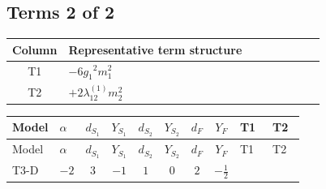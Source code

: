 \documentclass[8pt]{article}
\begin{document}
\begin{landscape}
\subsection*{Terms 2 of 2}
\begin{center}
\begin{tabular}{@{}c >{\raggedright\arraybackslash}p{0.82\linewidth}@{}}
\toprule
Column & Representative term structure \\
\midrule
T1 & \(\displaystyle -6 {g_1}^2 {m_1^2}\) \\
\midrule
T2 & \(\displaystyle +2 {\lambda_{12}^{(1)}} {m_2^2}\) \\
\midrule
\bottomrule
\end{tabular}
\end{center}
\smallskip
\tiny
\begin{longtable}{@{}llcccccc >{\raggedright\arraybackslash}p{0.21\linewidth} >{\raggedright\arraybackslash}p{0.21\linewidth}@{}}
\toprule
Model & $\alpha$ & $d_{S_1}$ & $Y_{S_1}$ & $d_{S_2}$ & $Y_{S_2}$ & $d_F$ & $Y_F$ & T1 & T2 \\
\midrule
\endfirsthead
\toprule
Model & $\alpha$ & $d_{S_1}$ & $Y_{S_1}$ & $d_{S_2}$ & $Y_{S_2}$ & $d_F$ & $Y_F$ & T1 & T2 \\
\midrule
\endhead
T3-D & $-2$ & $3$ & $-1$ & $1$ & $0$ & $2$ & $-\frac{1}{2}$ & \scriptsize\adjustbox{max width=\linewidth}{$\begin{gathered} -6 {g_1}^2 {m_1^2}\end{gathered}$} & \scriptsize\adjustbox{max width=\linewidth}{$\begin{gathered} +2 {\lambda_{12}^{(1)}} {m_2^2}\end{gathered}$} \\
\midrule
\bottomrule
\end{longtable}
\clearpage

\end{landscape}
\end{document}

